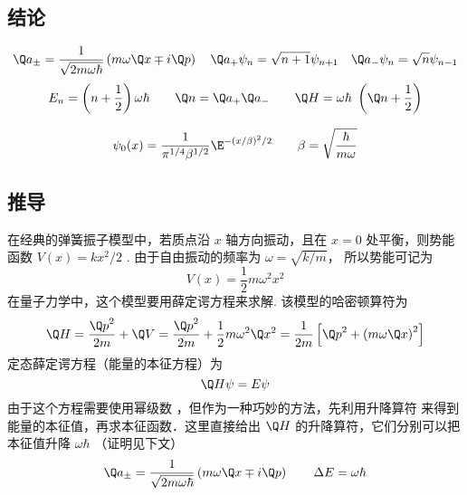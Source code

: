 

\subsection{结论}
\begin{equation}
{\Q a_ \pm } = \frac{1}{{\sqrt {2m\omega \hbar } }}\left( {m\omega \Q x \mp i\Q p} \right)
\quad
{\Q a_ + }{\psi _n} = \sqrt {n + 1}    {\psi _{n + 1}}
\quad
{\Q a_ - }{\psi _n} = \sqrt n    {\psi _{n - 1}}
\end{equation}
\begin{equation}
 {E_n} = \left( {n+\frac{1}{2} } \right)\omega \hbar
\qquad
\Q n = {\Q a_ + }{\Q a_ - }
\qquad
\Q H = \omega \hbar {\text{ }}\left( {\Q n + \frac{1}{2}} \right)
\end{equation}

\begin{equation}
\psi_0 (x) = \frac{1}{{{\pi ^{1/4}}{\beta ^{1/2}}}}{\E^{ - {{(x/\beta )}^2}/2}}  \qquad \beta  = \sqrt {\frac{\hbar }{{m\omega }}}
\end{equation}

\subsection{推导}
在经典的弹簧振子模型中，若质点沿 $x$ 轴方向振动，且在 $x = 0$ 处平衡，则势能函数 $V\left( x \right) = k{x^2}/{2}$ . 由于自由振动的频率为 $\omega  = \sqrt {{k}/{m}} $， 所以势能可记为
\begin{equation}
  V\left( x \right) = \frac{1}{2}m{\omega ^2}{x^2}
\end{equation}
在量子力学中，这个模型要用薛定谔方程来求解. 该模型的哈密顿算符为
\begin{equation}
  \Q H = \frac{{{{\Q p}^2}}}{{2m}} + \Q V = \frac{{{{\Q p}^2}}}{{2m}} + \frac{1}{2}m{\omega ^2}{\Q x^2} = \frac{1}{{2m}}\left[ {{{\Q p}^2} + {{\left( {m\omega \Q x} \right)}^2}} \right]
\end{equation}
定态薛定谔方程（能量的本征方程）为
\begin{equation}\label{QSHOop_eq6}
  \Q H\psi  = E\psi
\end{equation}
由于这个方程需要使用幂级数%
，但作为一种巧妙的方法，先利用升降算符%
来得到能量的本征值，再求本征函数．这里直接给出 $\Q H$ 的升降算符，它们分别可以把本征值升降 $\omega\hbar$ （证明见下文）
\begin{equation}
{\Q a_ \pm } = \frac{1}{{\sqrt {2m\omega \hbar } }}\left( {m\omega \Q x \mp i\Q p} \right)
\qquad
\Delta E = \omega \hbar
\end{equation}

